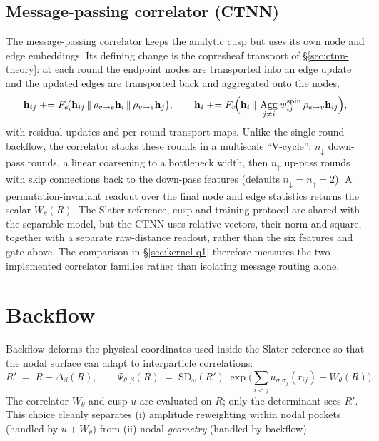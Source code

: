 \subsection{Message-passing correlator (CTNN)}
\label{subsec:ctnn-correlator}
The message-passing correlator keeps the analytic cusp but uses its own node and edge
embeddings. Its defining change is the copresheaf transport of
\S\ref{sec:ctnn-theory}: at each
round the endpoint nodes are transported into an edge update and the updated edges are
transported back and aggregated onto the nodes,
\begin{equation}
  \mathbf h_{ij} \mathrel{+}= F_e\!\big(\mathbf h_{ij}\,\|\,\rho_{v\to e}\mathbf h_i\,\|\,\rho_{v\to e}\mathbf h_j\big),
  \qquad
  \mathbf h_i \mathrel{+}= F_v\!\Big(\mathbf h_i\,\|\,\operatorname*{Agg}_{j\neq i} w_{ij}^{\rm spin}\,\rho_{e\to v}\mathbf h_{ij}\Big),
  \label{eq:ctnn-corr-step}
\end{equation}
with residual updates and per-round transport maps. Unlike the single-round backflow, the
correlator stacks these rounds in a multiscale ``V-cycle'': $n_{\downarrow}$ down-pass
rounds, a linear coarsening to a bottleneck width, then $n_{\uparrow}$ up-pass rounds with
skip connections back to the down-pass features (defaults $n_{\downarrow}=n_{\uparrow}=2$).
A permutation-invariant readout over the final node and edge statistics returns the scalar
$W_\theta(R)$. The Slater reference, cusp and training protocol are shared with the separable
model, but the CTNN uses relative vectors, their norm and square, together with a separate
raw-distance readout, rather than the six features and gate above. The comparison in
\S\ref{sec:kernel-q1} therefore measures the two implemented correlator families rather than
isolating message routing alone.

\section{Backflow}
\label{subsec:backflow-method}

Backflow deforms the physical coordinates used inside the Slater reference so that the nodal
surface can adapt to interparticle correlations:
\begin{equation}
  R' \;=\; R + \Delta_\beta(R) ,
  \qquad
  \Psi_{\theta,\beta}(R) \;=\; \mathrm{SD}_{\omega}(R')\;
  \exp\!\Big(\sum_{i<j} u_{\sigma_i\sigma_j}(r_{ij}) + W_\theta(R)\Big).
  \label{eq:bf-def}
\end{equation}
The correlator $W_\theta$ and cusp $u$ are evaluated on $R$; only the determinant sees $R'$.
This choice cleanly separates (i) amplitude reweighting within nodal pockets (handled by $u+W_\theta$) from (ii) nodal \emph{geometry} (handled by backflow).

